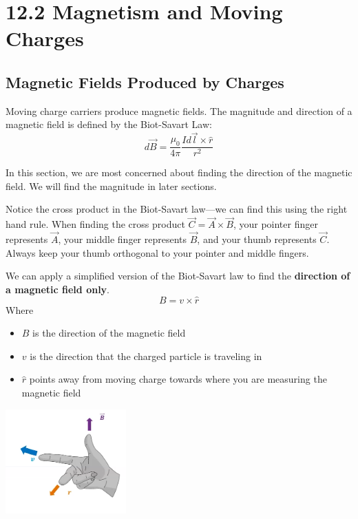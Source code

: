 \documentclass[12pt, titlepage]{article}
\begin{document}
\section*{12.2 Magnetism and Moving Charges}
\subsection*{Magnetic Fields Produced by Charges}

Moving charge carriers produce magnetic fields. The magnitude and direction of a magnetic field is defined by the Biot-Savart Law:
\begin{equation*}
    d\vec{B} = \frac{\mu_0}{4\pi}\frac{Id\vec{l}\times\hat{r}}{r^2}
\end{equation*}

In this section, we are most concerned about finding the direction of the magnetic field. We will find the magnitude in later sections.

Notice the cross product in the Biot-Savart law---we can find this using the right hand rule. When finding the cross product $\vec{C}=\vec{A}\times\vec{B}$, your pointer finger represents $\vec{A}$, your middle finger represents $\vec{B}$, and your thumb represents $\vec{C}$. Always keep your thumb orthogonal to your pointer and middle fingers.

We can apply a simplified version of the Biot-Savart law to find the \textbf{direction of a magnetic field only}.
\begin{equation*}
    B=v\times\hat{r}
\end{equation*}
Where
\begin{itemize}
    \item \textbf{$B$} is the direction of the magnetic field
    \item \textbf{$v$} is the direction that the charged particle is traveling in 
    \item \textbf{$\hat{r}$} points away from moving charge towards where you are measuring the magnetic field
\end{itemize}

\begin{center}
    \includegraphics[height=4cm]{media/rh1.png}
\end{center}
\end{document}
